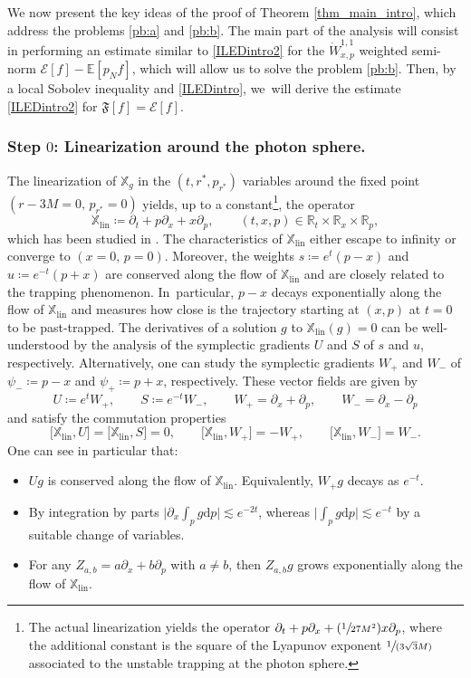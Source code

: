 \documentclass[10pt]{amsart}
\newcommand{\Psfrac}[2]{(\sfrac{#1}{#2})}
\newcommand{\spfrac}[2]{\sfrac{#1}{(#2)}}
\theoremstyle{plain}
\theoremstyle{definition}
\newcommand\R{{\mathbb{R}}}
\newcommand\T{{\mathbb{X}}}
\newcommand\dr{{\mathrm{d}}}
\begin{document}
We now present the key ideas of the proof of Theorem \ref{thm_main_intro}, which address the problems \eqref{pb:a} and \eqref{pb:b}. The main part of the analysis will consist in performing an estimate similar to \eqref{ILEDintro2} for the $\dot{W}^{1,1}_{x,p}$ weighted semi-norm $\mathcal{E}[f]-\mathbb{E}[p_Nf]$, which will allow us to solve the problem \eqref{pb:b}. Then, by a local Sobolev inequality and \eqref{ILEDintro}, we~will derive the estimate \eqref{ILEDintro2} for $\mathfrak{F}[f]= \mathcal{E}[f]$.

\subsubsection{Step $0$: Linearization around the photon sphere.} \label{linearised_ph_sph} The linearization of $\T_g$ in the $(t,r^*,p_{r^*})$ variables around the fixed point $(r-3M=0,\,p_{r^*}=0)$ yields, up to a constant\footnote{The actual linearization yields the operator $\partial_t +p \partial_x+\Psfrac{1}{27M^2}x \partial_p$, where the additional constant is the square of the Lyapunov exponent $\spfrac{1}{3\sqrt{3}M}$ associated to the unstable trapping at the photon sphere. }, the operator
\[
\T_{\mathrm{lin}}\coloneqq\partial_t +p \partial_x+x \partial_p, \qquad (t,x,p) \in \R_t \times \R_x \times \R_p,
\]
which has been studied in \cite{VV24}. The characteristics of $\T_{\mathrm{lin}}$ either escape to infinity or converge to $(x=0,\, p=0)$. Moreover, the weights $s\coloneqq e^t(p-x)$ and $u\coloneqq e^{-t}(p+x)$ are conserved along the flow of $\T_{\mathrm{lin}}$ and are closely related to the trapping phenomenon. In~particular, $p-x$ decays exponentially along the flow of $\T_{\mathrm{lin}}$ and measures how close is the trajectory starting at $(x,p)$ at $t=0$ to be past-trapped.
The derivatives of a solution $g$ to $\T_{\mathrm{lin}}(g)=0$ can be well-understood by the analysis of the symplectic gradients $U$ and $S$ of $s$ and $u$, respectively. Alternatively, one can study the symplectic gradients $W_+$ and $W_-$ of $\psi_-\coloneqq p-x$ and $\psi_+\coloneqq p+x$, respectively. These vector fields are given by
\[
U \coloneqq e^tW_+, \qquad S \coloneqq e^{-t}W_-, \qquad W_+=\partial_x+ \partial_p, \qquad W_- = \partial_x - \partial_p
\]
and satisfy the commutation properties
\[
\bigl[\T_{\mathrm{lin}}, U \bigr]= \bigl[\T_{\mathrm{lin}}, S \bigr]=0,\qquad \bigl[ \T_{\mathrm{lin}},W_+ \bigr]=-W_+,\qquad \bigl[ \T_{\mathrm{lin}},W_- \bigr]=W_-.
\]
One can see in particular that:
\begin{itemize}
\item $Ug$ is conserved along the flow of $\T_{\mathrm{lin}}$. Equivalently, $W_+g$ decays as $e^{-t}$.
\item By integration by parts $\big|\partial_x \int_p g \dr p\big| \lesssim e^{-2t}$, whereas $\big| \int_p g \dr p\big| \lesssim e^{-t}$ by a suitable change of variables.
\item For any $Z_{a,b}=a\partial_x+b\partial_p$ with $a \neq b$, then $Z_{a,b}g$ grows exponentially along the flow of $\T_{\mathrm{lin}}$.
\end{itemize}
\end{document}
